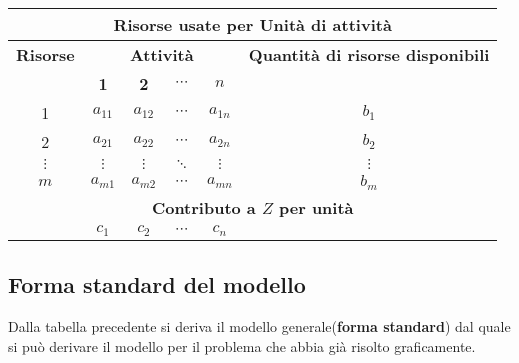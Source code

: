 \documentclass{article}
\begin{document}
\begin{table}[ht]
  \centering
  \begin{tabular}{|c|c|c|c|c|c|}
    \hline
    \multicolumn{6}{|c|}{\textbf{Risorse usate per Unità di attività}}                                                                                        \\
    \hline
    \textbf{Risorse}       & \multicolumn{4}{|c|}{\textbf{Attività}} & \textbf{Quantità di risorse disponibili}                                               \\
    \cline{2-5}
                           & \textbf{1}                              & \textbf{2}                               & \textbf{$\cdots$} & \textbf{$n$} &          \\
    \hline
    1                      & $a_{11}$                                & $a_{12}$                                 & $\cdots$          & $a_{1n}$     & $b_1$    \\
    2                      & $a_{21}$                                & $a_{22}$                                 & $\cdots$          & $a_{2n}$     & $b_2$    \\
    $\vdots$               & $\vdots$                                & $\vdots$                                 & $\ddots$          & $\vdots$     & $\vdots$ \\
    $m$                    & $a_{m1}$                                & $a_{m2}$                                 & $\cdots$          & $a_{mn}$     & $b_m$    \\
    \hline
    \multicolumn{6}{|c|}{\textbf{Contributo a $Z$ per unità}}                                                                                                 \\
    \hline
    \multicolumn{1}{|c|}{} & $c_1$                                   & $c_2$                                    & $\cdots$          & $c_n$        &          \\
    \hline
  \end{tabular}
\end{table}

\subsection{Forma standard del modello}
Dalla tabella precedente si deriva il modello generale(\textbf{forma standard}) dal quale si può derivare il modello per il problema che abbia già risolto graficamente.\\
\end{document}

